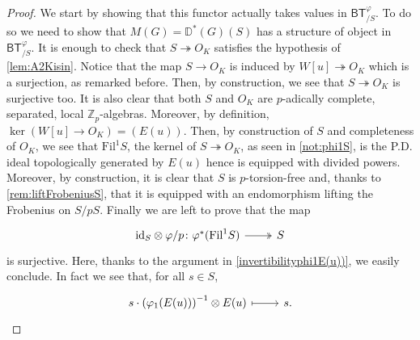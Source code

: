 \begin{proof}\leavevmode\vspace{-.2\baselineskip}
We start by showing that this functor actually takes values in $\mathsf{BT}^{\varphi}_{/S}$.
To do so we need to show that $M(G) = \mathbb{D}^{*}(G)(S)$
has a structure of object in $\mathsf{BT}^{\varphi}_{/S}$.
It is enough to check that $S \twoheadrightarrow O_K$ satisfies
the hypothesis of \cref{lem:A2Kisin}.
Notice that the map $S \to O_K$ is induced by $W[u] \twoheadrightarrow O_K$
which is a surjection, as remarked before.
Then, by construction, we see that $S \twoheadrightarrow O_K$
is surjective too.
It is also clear that both $S$ and $O_K$ are 
$p$-adically complete, separated, local $\mathbb{Z}_{p}$-algebras.
Moreover, by definition, $\ker (W[u] \to O_K) = (E(u))$.
Then, by construction of $S$ and completeness of $O_K$,
we see that $\mathrm{Fil}^1 S$, the kernel of $S \twoheadrightarrow O_K$, 
as seen in \cref{not:phi1S}, is the P.D. ideal topologically generated by $E(u)$ hence is
equipped with divided powers.
Moreover, by construction, it is clear that $S$ is $p$-torsion-free
and, thanks to \cref{rem:liftFrobeniusS},
that it is equipped with an endomorphism lifting the Frobenius on $S/pS$.
Finally we are left to prove that the map
\begin{equation*}
\begin{tikzcd}[row sep = 0ex
	,/tikz/column 1/.append style={anchor=base east}
	,/tikz/column 2/.append style={anchor=base west}]
	\mathrm{id}_{ S } \otimes \varphi/p \colon 
	\varphi^*(\mathrm{Fil}^1 S) \arrow[r, "", twoheadrightarrow] &
	S
\end{tikzcd}
\end{equation*} 
is surjective.
Here, thanks to the argument in \cref{invertibilityphi1E(u))}, we easily conclude.
In fact we see that, for all $s \in S$,
\begin{equation*}
\begin{tikzcd}[row sep = 0ex
	,/tikz/column 1/.append style={anchor=base east}
	,/tikz/column 2/.append style={anchor=base west}]
	s \cdot \left( \varphi_1(E(u)) \right)^{-1} \otimes E(u) 
	\arrow[r, "", mapsto] & 
	s
.\end{tikzcd}
\end{equation*} 




\end{proof}
